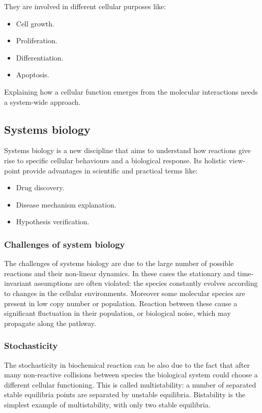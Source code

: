     They are involved in different cellular purposes like:

    \begin{multicols}{2}
      \begin{itemize}
        \item Cell growth.
        \item Proliferation.
        \item Differentiation.
        \item Apoptosis.
      \end{itemize}
    \end{multicols}

    Explaining how a cellular function emerges from the molecular interactions needs a system-wide approach.

  \subsection{Systems biology}
  Systems biology is a new discipline that aims to understand how reactions give rise to specific cellular behaviours and a biological response.
  Its holistic view-point provide advantages in scientific and practical terms like:

  \begin{multicols}{2}
    \begin{itemize}
      \item Drug discovery.
      \item Disease mechanism explanation.
      \item Hypothesis verification.
    \end{itemize}
  \end{multicols}

    \subsubsection{Challenges of system biology}
    The challenges of systems biology are due to the large number of possible reactions and their non-linear dynamics.
    In these cases the stationary and time-invariant assumptions are often violated: the species constantly evolves according to changes in the cellular environments.
    Moreover some molecular species are present in low copy number or population.
    Reaction between these cause a significant fluctuation in their population, or biological noise, which may propagate along the pathway.

    \subsubsection{Stochasticity}
    The stochasticity in biochemical reaction can be also due to the fact that after many non-reactive collisions between species the biological system could choose a different cellular functioning.
    This is called multistability: a number of separated stable equilibria points are separated by unstable equilibria.
    Bistability is the simplest example of multistability, with only two stable equilibria.

